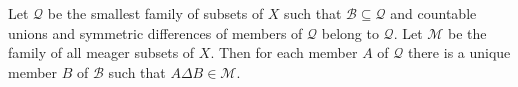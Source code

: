 Let $\mathcal{Q}$ be the smallest family of subsets of $X$ such that $\mathcal{B} \subseteq \mathcal{Q}$ and countable unions and symmetric differences of members of $\mathcal{Q}$ belong to $\mathcal{Q}$. Let $\mathcal{M}$ be the family of all meager subsets of $X$. Then for each member $A$ of $\mathcal{Q}$ there is a unique member $B$ of $\mathcal{B}$ such that $A \Delta B \in \mathcal{M}$.
